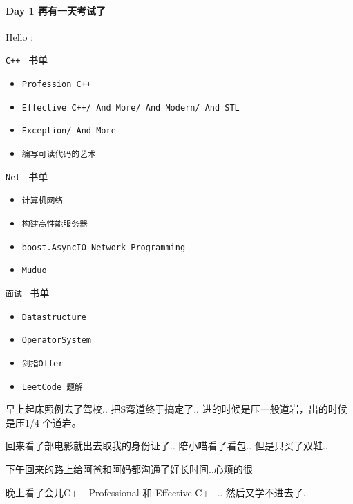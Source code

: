 \documentclass[UTF8,a4paper,8pt]{ctexart}
\begin{document}
 	 \paragraph{Day 1  再有一天考试了     \quad     }Hello :
 	 
	 	 \verb|C++ | 书单
		 	 \begin{itemize}[itemindent = 2em]
		 	 	\item \verb|Profession C++|
		 	 	\item \verb|Effective C++/ And More/ And Modern/ And STL|
		 	 	\item \verb|Exception/ And More|
		 	 	\item \verb|编写可读代码的艺术|
		 	 \end{itemize}
	 	 
	 	 \verb|Net | 书单
		 	 \begin{itemize}[itemindent = 2em]
		 	 	\item \verb|计算机网络|
		 	 	\item \verb|构建高性能服务器|
		 	 	\item \verb|boost.AsyncIO Network Programming|
		 	 	\item \verb|Muduo|
		 	 \end{itemize}
	 	 
	 	 \verb|面试 | 书单
		 	 \begin{itemize}[itemindent = 2em]
		 	 	\item \verb|Datastructure|
		 	 	\item \verb|OperatorSystem|
		 	 	\item \verb|剑指Offer|
		 	 	\item \verb|LeetCode 题解|
		 	 \end{itemize}
		 	
		 早上起床照例去了驾校.. 把S弯道终于搞定了.. 进的时候是压一般道岩，出的时候是压1/4 个道岩。
		 
		 回来看了部电影就出去取我的身份证了.. 陪小喵看了看包.. 但是只买了双鞋..
		 
		 下午回来的路上给阿爸和阿妈都沟通了好长时间..心烦的很
		 
		 晚上看了会儿C++ Professional 和 Effective C++.. 然后又学不进去了..
		 
\end{document}
